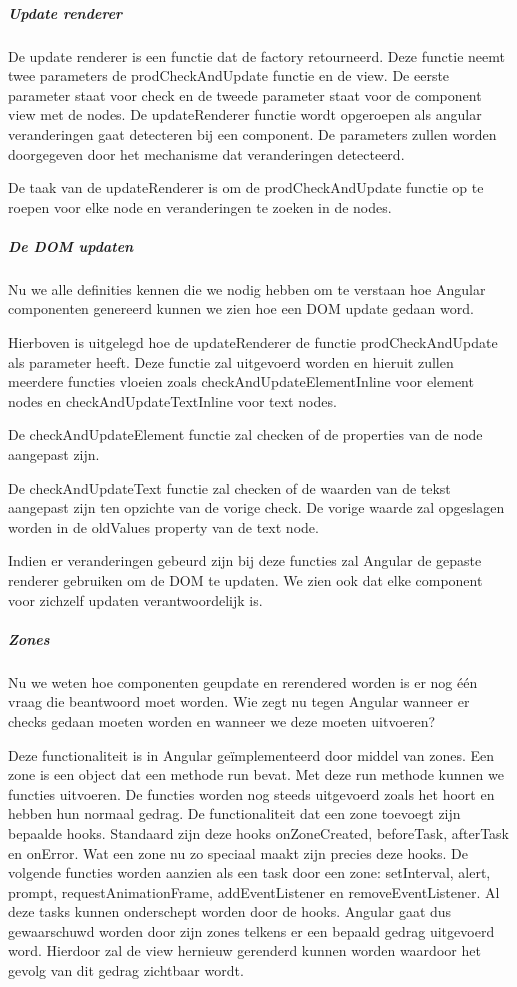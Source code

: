 \subparagraph{Update renderer}
De update renderer is een functie dat de factory retourneerd. Deze functie neemt twee parameters de prodCheckAndUpdate functie en de view. De eerste parameter staat voor check en de tweede parameter staat voor de component view met de nodes. De updateRenderer functie wordt opgeroepen als angular veranderingen gaat detecteren bij een component. De parameters zullen worden doorgegeven door het mechanisme dat veranderingen detecteerd.

De taak van de updateRenderer is om de prodCheckAndUpdate functie op te roepen voor elke node en veranderingen te zoeken in de nodes.

\subparagraph{De DOM updaten}
Nu we alle definities kennen die we nodig hebben om te verstaan hoe Angular componenten genereerd kunnen we zien hoe een DOM update gedaan word.

Hierboven is uitgelegd hoe de updateRenderer de functie prodCheckAndUpdate als parameter heeft. Deze functie zal uitgevoerd worden en hieruit zullen meerdere functies vloeien zoals checkAndUpdateElementInline voor element nodes en checkAndUpdateTextInline voor text nodes.

De checkAndUpdateElement functie zal checken of de properties van de node aangepast zijn.

De checkAndUpdateText functie zal checken of de waarden van de tekst aangepast zijn ten opzichte van de vorige check. De vorige waarde zal opgeslagen worden in de oldValues property van de text node.

Indien er veranderingen gebeurd zijn bij deze functies zal Angular de gepaste renderer gebruiken om de DOM te updaten. We zien ook dat elke component voor zichzelf updaten verantwoordelijk is.

\subparagraph{Zones}
Nu we weten hoe componenten geupdate en rerendered worden is er nog één vraag die beantwoord moet worden. Wie zegt nu tegen Angular wanneer er checks gedaan moeten worden en wanneer we deze moeten uitvoeren?

Deze functionaliteit is in Angular geïmplementeerd door middel van zones. Een zone is een object dat een methode run bevat. Met deze run methode kunnen we functies uitvoeren. De functies worden nog steeds uitgevoerd zoals het hoort en hebben hun normaal gedrag. De functionaliteit dat een zone toevoegt zijn bepaalde hooks. Standaard zijn deze hooks onZoneCreated, beforeTask, afterTask en onError. Wat een zone nu zo speciaal maakt zijn precies deze hooks. De volgende functies worden aanzien als een task door een zone: setInterval, alert, prompt, requestAnimationFrame, addEventListener en removeEventListener. Al deze tasks kunnen onderschept worden door de hooks. Angular gaat dus gewaarschuwd worden door zijn zones telkens er een bepaald gedrag uitgevoerd word. Hierdoor zal de view hernieuw gerenderd kunnen worden waardoor het gevolg van dit gedrag zichtbaar wordt.


